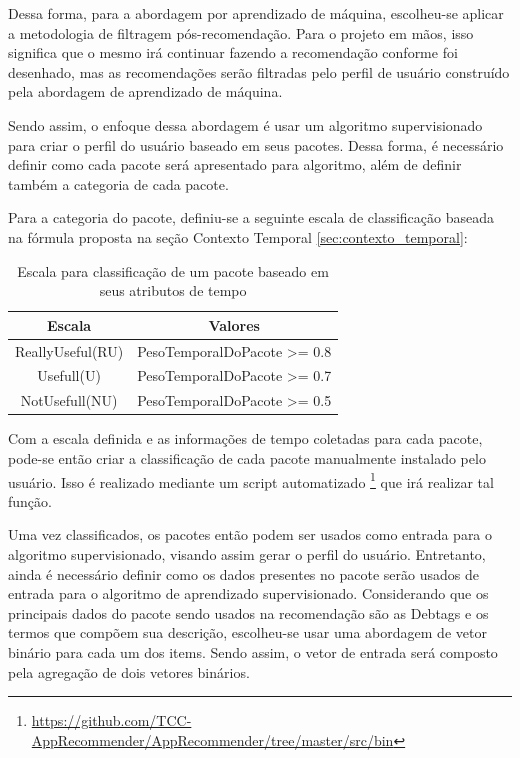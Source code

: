 Dessa forma, para a abordagem por aprendizado de máquina, escolheu-se aplicar a
metodologia de filtragem pós-recomendação. Para o projeto em mãos, isso
significa que o mesmo irá continuar fazendo a recomendação conforme foi
desenhado, mas as recomendações serão filtradas pelo perfil de usuário
construído pela abordagem de aprendizado de máquina.

Sendo assim, o enfoque dessa abordagem é usar um algoritmo supervisionado
para criar o perfil do usuário baseado em seus pacotes. Dessa forma, é
necessário definir como cada pacote será apresentado para algoritmo, além de
definir também a categoria de cada pacote.

Para a categoria do pacote, definiu-se a seguinte escala de classificação baseada na
fórmula proposta na seção Contexto Temporal \ref{sec:contexto_temporal}:

\begin{table}[h]
\centering
\begin{tabular}{cc}
\hline
\rowcolor[HTML]{EFEFEF}
{Escala} & {Valores} \\ \hline
{ReallyUseful(RU)}  & PesoTemporalDoPacote >= 0.8                  \\ \hline
{Usefull(U)}   & PesoTemporalDoPacote >= 0.7                  \\ \hline
{NotUsefull(NU)}   & PesoTemporalDoPacote >= 0.5                  \\ \hline
\end{tabular}
\caption{Escala para classificação de um pacote baseado em seus atributos de tempo}
\label{tab:classificacao_pacotes}
\end{table}


Com a escala definida e as informações de tempo coletadas para cada pacote,
pode-se então criar a classificação de cada pacote manualmente instalado pelo
usuário.
Isso é realizado mediante um script automatizado \footnote{\url{https://github.com/TCC-AppRecommender/AppRecommender/tree/master/src/bin}}
que irá realizar tal função.

Uma vez classificados, os pacotes então podem ser usados como entrada para o
algoritmo supervisionado, visando assim gerar o perfil do usuário.
Entretanto, ainda é necessário definir como os dados presentes no pacote serão usados de entrada para o
algoritmo de aprendizado supervisionado. Considerando que os principais dados do pacote sendo usados na
recomendação são as Debtags e os termos que compõem sua descrição, escolheu-se usar uma abordagem de
vetor binário para cada um dos items. Sendo assim, o vetor de entrada será composto pela agregação de dois vetores
binários.

